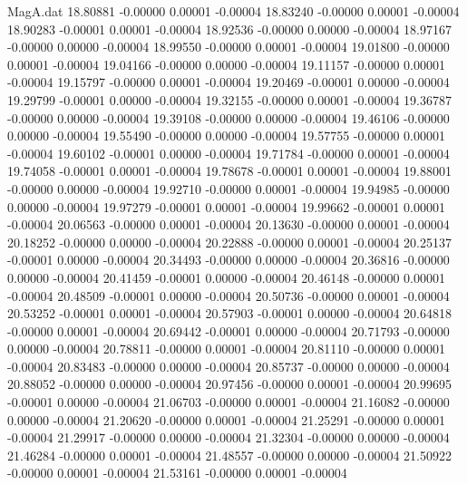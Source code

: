 \begin{filecontents}{MagA.dat}
  18.80881   -0.00000    0.00001   -0.00004
  18.83240   -0.00000    0.00001   -0.00004
  18.90283   -0.00001    0.00001   -0.00004
  18.92536   -0.00000    0.00000   -0.00004
  18.97167   -0.00000    0.00000   -0.00004
  18.99550   -0.00000    0.00001   -0.00004
  19.01800   -0.00000    0.00001   -0.00004
  19.04166   -0.00000    0.00000   -0.00004
  19.11157   -0.00000    0.00001   -0.00004
  19.15797   -0.00000    0.00001   -0.00004
  19.20469   -0.00001    0.00000   -0.00004
  19.29799   -0.00001    0.00000   -0.00004
  19.32155   -0.00000    0.00001   -0.00004
  19.36787   -0.00000    0.00000   -0.00004
  19.39108   -0.00000    0.00000   -0.00004
  19.46106   -0.00000    0.00000   -0.00004
  19.55490   -0.00000    0.00000   -0.00004
  19.57755   -0.00000    0.00001   -0.00004
  19.60102   -0.00001    0.00000   -0.00004
  19.71784   -0.00000    0.00001   -0.00004
  19.74058   -0.00001    0.00001   -0.00004
  19.78678   -0.00001    0.00001   -0.00004
  19.88001   -0.00000    0.00000   -0.00004
  19.92710   -0.00000    0.00001   -0.00004
  19.94985   -0.00000    0.00000   -0.00004
  19.97279   -0.00001    0.00001   -0.00004
  19.99662   -0.00001    0.00001   -0.00004
  20.06563   -0.00000    0.00001   -0.00004
  20.13630   -0.00000    0.00001   -0.00004
  20.18252   -0.00000    0.00000   -0.00004
  20.22888   -0.00000    0.00001   -0.00004
  20.25137   -0.00001    0.00000   -0.00004
  20.34493   -0.00000    0.00000   -0.00004
  20.36816   -0.00000    0.00000   -0.00004
  20.41459   -0.00001    0.00000   -0.00004
  20.46148   -0.00000    0.00001   -0.00004
  20.48509   -0.00001    0.00000   -0.00004
  20.50736   -0.00000    0.00001   -0.00004
  20.53252   -0.00001    0.00001   -0.00004
  20.57903   -0.00001    0.00000   -0.00004
  20.64818   -0.00000    0.00001   -0.00004
  20.69442   -0.00001    0.00000   -0.00004
  20.71793   -0.00000    0.00000   -0.00004
  20.78811   -0.00000    0.00001   -0.00004
  20.81110   -0.00000    0.00001   -0.00004
  20.83483   -0.00000    0.00000   -0.00004
  20.85737   -0.00000    0.00000   -0.00004
  20.88052   -0.00000    0.00000   -0.00004
  20.97456   -0.00000    0.00001   -0.00004
  20.99695   -0.00001    0.00000   -0.00004
  21.06703   -0.00000    0.00001   -0.00004
  21.16082   -0.00000    0.00000   -0.00004
  21.20620   -0.00000    0.00001   -0.00004
  21.25291   -0.00000    0.00001   -0.00004
  21.29917   -0.00000    0.00000   -0.00004
  21.32304   -0.00000    0.00000   -0.00004
  21.46284   -0.00000    0.00001   -0.00004
  21.48557   -0.00000    0.00000   -0.00004
  21.50922   -0.00000    0.00001   -0.00004
  21.53161   -0.00000    0.00001   -0.00004

\end{filecontents}
